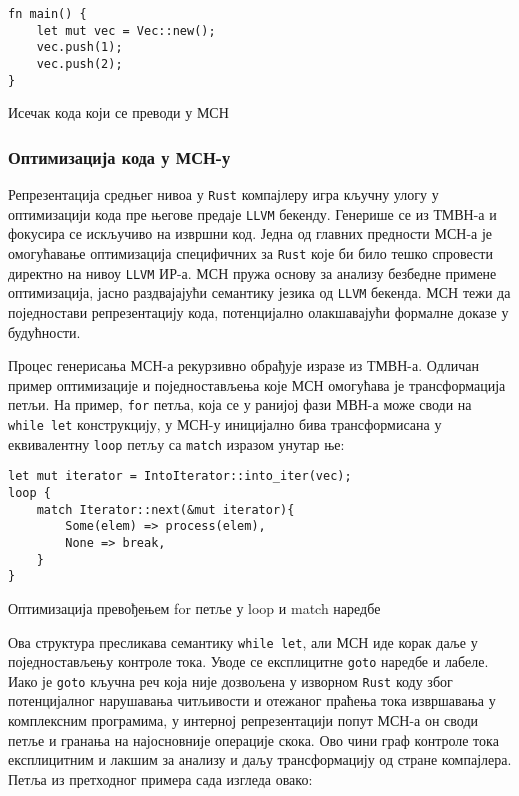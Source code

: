 \begin{listing}[H]
\begin{verbatim}
fn main() {
    let mut vec = Vec::new();
    vec.push(1);
    vec.push(2);
}
\end{verbatim}
\caption{Исечак кода који се преводи у МСН}
\label{lst:snippet-before-mir}
\end{listing}

\subsubsection{Оптимизација кода у МСН-у}

Репрезентација средњег нивоа у \verb|Rust| компајлеру игра кључну улогу у оптимизацији кода пре његове предаје \verb|LLVM| бекенду. 
Генерише се из ТМВН-а и фокусира се искључиво на извршни код. Једна од главних предности МСН-а је омогућавање оптимизација специфичних за \verb|Rust| које би било тешко 
спровести директно на нивоу \verb|LLVM| ИР-а. МСН пружа основу за анализу безбедне примене оптимизација, 
јасно раздвајајући семантику језика од \verb|LLVM| бекенда. МСН тежи да поједностави репрезентацију кода, потенцијално олакшавајући формалне доказе у будућности.

Процес генерисања МСН-а рекурзивно обрађује изразе из ТМВН-а. Одличан пример оптимизације и поједностављења које МСН омогућава је 
трансформација петљи. На пример, \verb|for| петља, која се у ранијој фази МВН-а може своди на \verb|while let| конструкцију,
у МСН-у иницијално бива трансформисана у еквивалентну \verb|loop| петљу са \verb|match| изразом унутар ње:

\begin{listing}[H]
\begin{verbatim}
let mut iterator = IntoIterator::into_iter(vec);
loop {
    match Iterator::next(&mut iterator){
        Some(elem) => process(elem),
        None => break,
    }
}
\end{verbatim}
\caption{Оптимизација превођењем for петље у loop и match наредбе}
\label{lst:optimization-0}
\end{listing}

Ова структура пресликава семантику \verb|while let|, али МСН иде корак даље у поједностављењу контроле тока. Уводе се експлицитне \verb|goto| 
наредбе и лабеле. Иако је \verb|goto| кључна реч која није дозвољена у изворном \verb|Rust| коду због потенцијалног нарушавања читљивости и 
отежаног праћења тока извршавања у комплексним програмима, у интерној репрезентацији попут МСН-а он своди петље и гранања на најосновније 
операције скока. Ово чини граф контроле тока експлицитним и лакшим за анализу и даљу трансформацију од стране компајлера. 
Петља из претходног примера сада изгледа овако:

